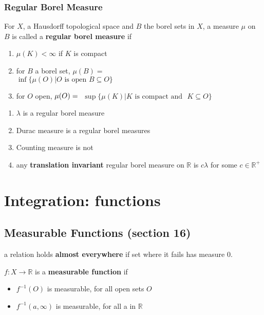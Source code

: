 \documentclass[a4paper, 12pt]{article}
\def\R{\ensuremath{\mathbb{R}}} %
\newcommand{\bt}[1]{\textbf{#1}} %
\newcommand{\gray}[1]{{\leavevmode\color[gray]{0.5}{#1}}} %
\begin{document}
\begin{multicols}{2}
\subsubsection{Regular Borel Measure}
For $X$, a Hausdorff topological space and $B$ the borel sets in $X$, 
a measure $\mu$ on $B$ is called a \bt{regular borel measure} if 
\begin{enumerate}
    \item $\mu(K) < \infty$ if $K$ is compact 
    \item for $B$ a borel set, $\mu(B) =$\\ $\inf \{\mu(O) | O \text{ is open } B \subseteq O\}$ 
    \item for $O$ open, $\mu(O) = \\$  $\sup\{\mu(K) | K \text{ is compact and }$ $K \subseteq O\}$
\end{enumerate}

\begin{enumerate}
    \item $\lambda$ is a regular borel measure
    \item Durac measure is a regular borel measures
    \item Counting measure is not\\
    \gray{for example $[0, 1]$ is compact, but has infinite measure}
    \item any \bt{translation invariant} regular borel measure on $\R$ is 
    $c \lambda$ for some $c \in \R^+$
\end{enumerate}

\section{Integration: functions}

\subsection{Measurable Functions (section 16)}

a relation holds \bt{almost everywhere} if set where it fails has measure 0.

$f: X \rightarrow \R$ is a \bt{measurable function} if 
\begin{itemize}
    \item $f^{-1}(O)$ is measurable, for all open sets $O$
    \item $f^{-1}(a, \infty)$ is measurable, for all a in $\R$
\end{itemize}


\end{multicols}
\end{document}
